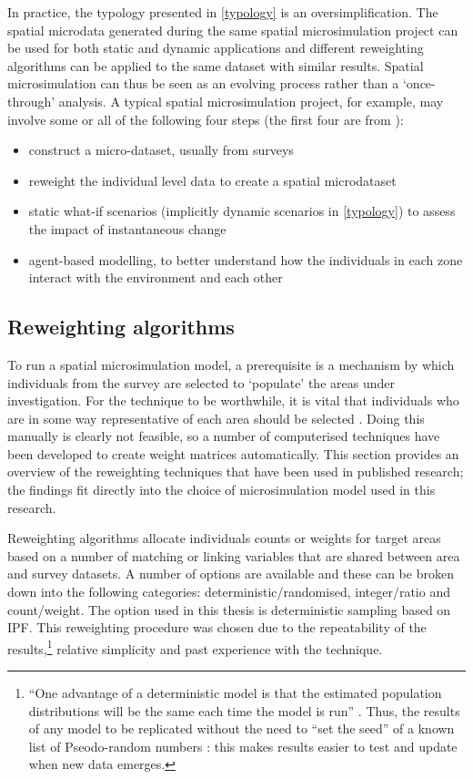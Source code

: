 \documentclass[a4paper, 11pt, twoside]{Thesis}
\begin{document}
In practice, the typology presented in \cref{typology} is an
oversimplification. The spatial microdata generated during the same spatial
microsimulation project can be used for both static and dynamic applications and
different reweighting algorithms can be applied to the same dataset with
similar results. Spatial microsimulation can thus be seen as an evolving
process rather than a `once-through' analysis. A typical spatial microsimulation
project, for example, may involve some or all of the following four steps
(the first four are from \citealp{ballas2003microsimulation-30-years}):
\begin{itemize}
 \item construct a micro-dataset, usually from surveys
 \item reweight the individual level data to create a spatial microdataset
 \item static what-if scenarios (implicitly dynamic scenarios in
\cref{typology}) to assess the impact of instantaneous change
 \item agent-based modelling, to better understand how the individuals in each
zone interact with the environment and each other
\end{itemize}


\subsection{Reweighting algorithms} 
\label{sreweight}
To run a spatial microsimulation model, a prerequisite is a mechanism by
which individuals from the survey are selected to `populate' the areas under
investigation. For the technique to be worthwhile, it is vital that individuals
who are in some way representative of each area should be selected
\citep{Ballas2005}⁠. Doing this manually is clearly not feasible, so a number
of computerised techniques have been developed to create weight matrices
automatically. This section provides an overview of the reweighting techniques
that have been used in published research; the findings fit directly into the
choice of microsimulation model used in this research. 

Reweighting algorithms allocate individuals counts or weights for target
areas based on a number of matching or linking variables that are shared between
area and survey datasets. A number of options are available and these can be
broken down into the following categories:
deterministic/randomised, integer/ratio and count/weight.
The option used in this thesis is deterministic
sampling based on IPF. This reweighting procedure was
chosen due to the repeatability of the
results,\footnote{``One
advantage of a deterministic model is that the estimated population
distributions will be the same each time the model is run'' \citep{Smith2009}⁠.
Thus, the results of any model to be replicated
without the need to ``set the seed'' of a known list of
Pseodo-random numbers \citep{Robert2009}: this makes results easier to
test and update when new data emerges.}
relative simplicity and past experience with
the technique.
\end{document}
